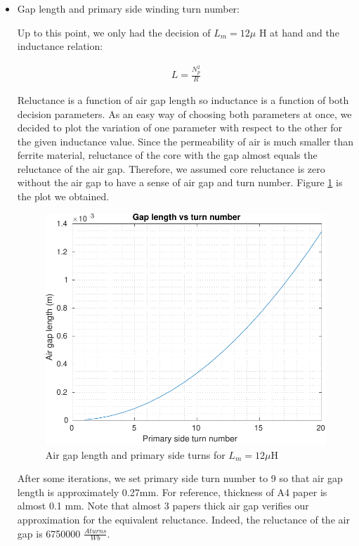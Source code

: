 \documentclass[12pt]{article}
\begin{document}
    \begin{itemize}
        \item Gap length and primary side winding turn number:

        Up to this point, we only had the decision of $L_m = 12\mu$ H at hand and the inductance relation:

        \begin{align*}
            L = \frac{N_p^2}{R}
        \end{align*}

        Reluctance is a function of air gap length so inductance is a function of both decision parameters. As an easy way of choosing both parameters at once, we decided to plot the variation of one parameter with respect to the other for the given inductance value. Since the permeability of air is much smaller than ferrite material, reluctance of the core with the gap almost equals the reluctance of the air gap. Therefore, we assumed core reluctance is zero without the air gap to have a sense of air gap and turn number. Figure \ref{fig:airgapvsturns} is the plot we obtained.

        \begin{figure}[H]
            \centering
            \includegraphics{img/airgapvsturns.pdf}
            \caption{Air gap length and primary side turns for $L_m = 12\mu$H}
            \label{fig:airgapvsturns}
        \end{figure}

        After some iterations, we set primary side turn number to 9 so that air gap length is approximately 0.27mm. For reference, thickness of A4 paper is almost 0.1 mm. Note that almost 3 papers thick air gap verifies our approximation for the equivalent reluctance. Indeed, the reluctance of the air gap is  6750000 $\frac{Aturns}{Wb}$.
        

\end{itemize}
\end{document}
